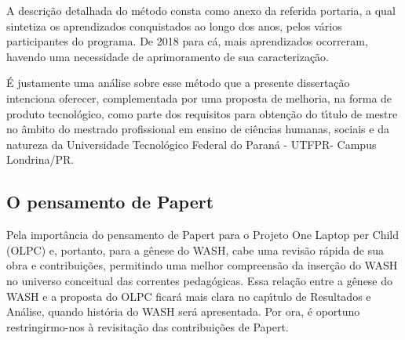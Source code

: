 \documentclass[
12pt,		%
openright,	%
twoside,  %
a4paper,			%
chapter=TITLE,		%
english,			%
french,				%
spanish,			%
brazil				%
]{USPSC-classe/USPSC}
\begin{document}
A descri\c{c}\~ao detalhada do m\'etodo consta como anexo da referida portaria, a qual sintetiza os aprendizados conquistados ao longo dos anos, pelos v\'arios participantes do programa. De 2018 para c\'a, mais aprendizados ocorreram, havendo uma necessidade de aprimoramento de sua caracteriza\c{c}\~ao.

















\'E justamente uma an\'alise sobre esse m\'etodo que a presente disserta\c{c}\~ao intenciona oferecer, complementada por uma proposta de melhoria, na forma de produto tecnol\'ogico, como parte dos requisitos para obten\c{c}\~ao do t\'{\i}tulo de mestre no \^ambito do mestrado profissional em ensino de ci\^encias humanas, sociais e da natureza da Universidade  Tecnol\'ogico  Federal do Paran\'a - UTFPR- Campus Londrina/PR.

















\subsection[O pensamento de Papert]{O pensamento de Papert}\label{O pensamento de Papert}
Pela import\^ancia do pensamento de Papert para o Projeto One Laptop per Child (OLPC) e, portanto, para a g\^enese do WASH, cabe uma revis\~ao r\'apida de sua obra e contribui\c{c}\~oes, permitindo uma melhor compreens\~ao da inser\c{c}\~ao do WASH no universo conceitual das correntes pedag\'ogicas. Essa rela\c{c}\~ao entre a g\^enese do WASH e a proposta do OLPC ficar\'a mais clara no cap\'{\i}tulo de Resultados e An\'alise, quando hist\'oria do WASH ser\'a apresentada. Por ora, \'e oportuno restringirmo-nos \`a revisita\c{c}\~ao das contribui\c{c}\~oes de Papert.
\end{document}
